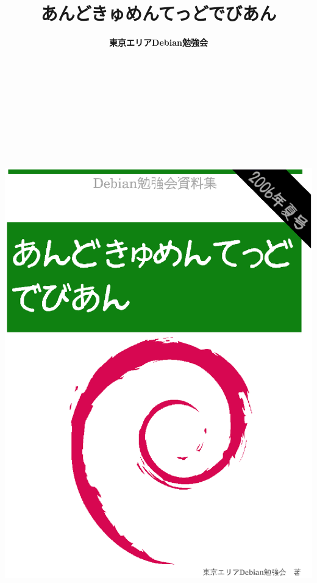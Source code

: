 \documentclass[mingoth,a4paper]{jsarticle}
\begin{document}
\begin{titlepage}

\title{
あんどきゅめんてっどでびあん}
\date{}
\author{\bf 東京エリアDebian勉強会} 

\includegraphics[height=252mm]{image2006-natsu/titlepage-summer.eps}

\end{titlepage}
\end{document}
